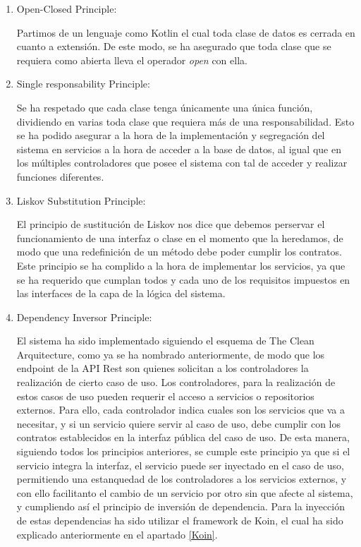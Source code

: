         \begin{enumerate}
            \item Open-Closed Principle:
            
            Partimos de un lenguaje como Kotlin el cual toda clase de datos es cerrada en cuanto a extensión. De este modo, se ha asegurado que toda clase que se requiera como abierta lleva el operador \textit{open} con ella.
            
            \item Single responsability Principle:
            
            Se ha respetado que cada clase tenga únicamente una única función, dividiendo en varias toda clase que requiera más de una responsabilidad. Esto se ha podido asegurar a la hora de la implementación y segregación del sistema en servicios a la hora de acceder a la base de datos, al igual que en los múltiples controladores que posee el sistema con tal de acceder y realizar funciones diferentes.
            
            \item Liskov Substitution Principle:
            
            El principio de sustitución de Liskov nos dice que debemos perservar el funcionamiento de una interfaz o clase en el momento que la heredamos, de modo que una redefinición de un método debe poder cumplir los contratos. Este principio se ha complido a la hora de implementar los servicios, ya que se ha requerido que cumplan todos y cada uno de los requisitos impuestos en las interfaces de la capa de la lógica del sistema.
            
            \item Dependency Inversor Principle:
            
            El sistema ha sido implementado siguiendo el esquema de The Clean Arquitecture, como ya se ha nombrado anteriormente, de modo que los endpoint de la API Rest son quienes solicitan a los controladores la realización de cierto caso de uso.
            Los controladores, para la realización de estos casos de uso pueden requerir el acceso a servicios o repositorios externos. Para ello, cada controlador indica cuales son los servicios que va a necesitar, y si un servicio quiere servir al caso de uso, debe cumplir con los contratos establecidos en la interfaz pública del caso de uso.
            De esta manera, siguiendo todos los principios anteriores, se cumple este principio ya que si el servicio integra la interfaz, el servicio puede ser inyectado en el caso de uso, permitiendo una estanquedad de los controladores a los servicios externos, y con ello facilitanto el cambio de un servicio por otro sin que afecte al sistema, y cumpliendo así el principio de inversión de dependencia.
            Para la inyección de estas dependencias ha sido utilizar el framework de Koin, el cual ha sido explicado anteriormente en el apartado \ref{Koin}.
            

\end{enumerate}
